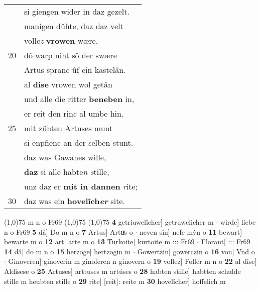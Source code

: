 \documentclass[8pt,a4paper,notitlepage]{article}
\begin{document}
\begin{table}[ht]
\begin{minipage}[t]{0.5\linewidth}
\begin{tabular}{rl}
 & si giengen wider in daz gezelt.\\ 
 & manigen dûhte, daz daz velt\\ 
 & volle\textit{z} \textbf{vrowen} wære.\\ 
20 & dô warp niht sô der swære\\ 
 & Artus spranc ûf ein kastelân.\\ 
 & al \textbf{dise} vrowen wol getân\\ 
 & und alle die ritter \textbf{beneben} in,\\ 
 & er reit den rinc al umbe hin.\\ 
25 & mit zühten Artuses munt\\ 
 & si enpfienc an der selben stunt.\\ 
 & daz was Gawanes wille,\\ 
 & \textbf{daz} si alle habte\textit{n s}tille,\\ 
 & unz daz er \textbf{mit in dannen} \textit{r}ite;\\ 
30 & daz was ein \textbf{hovelîch\textit{er}} site.\\ 
\end{tabular}
\scriptsize
\line(1,0){75} \newline
m n o Fr69 \newline
\line(1,0){75} \newline
\newline
\line(1,0){75} \newline
\textbf{4} getriuwelîcher] getruwclicher m  $\cdot$ wirde] liebe n o Fr69 \textbf{5} dâ] Do m n o \textbf{7} Artus] Artuͯs o  $\cdot$ neven sîn] nefe mẏn o \textbf{11} bewart] bewarte m o \textbf{12} art] arte m o \textbf{13} Turkoite] kurtoite m ::: Fr69  $\cdot$ Florant] ::: Fr69 \textbf{14} dâ] do m n o \textbf{15} herzoge] hertzogin m  $\cdot$ Gowertzin] gowerczin o \textbf{16} von] Vnd o  $\cdot$ Ginoveren] ginoverin m ginoferen n ginovern o \textbf{19} vollez] Foller m n o \textbf{22} al dise] Aldisese o \textbf{25} Artuses] arttuses m artúses o \textbf{28} habten stille] habtten schulde stille m heubten stille o \textbf{29} rite] [reit]: reite m \textbf{30} hovelîcher] hoffelich m \newline
\end{minipage}
\end{table}
\newpage
\end{document}
